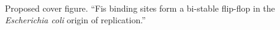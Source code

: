 \documentclass[doublespacing]{narfront}
\begin{document}
\clearpage %

\newpage


$\;$ %

\vspace{120 pt}

\begin{center}
\end{center}
Proposed cover figure.
``Fis binding sites form a
bi-stable
flip-flop in the
\emph{Escherichia coli}
origin of replication.''

\end{document}
